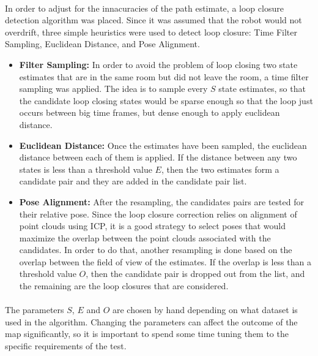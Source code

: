 \documentclass[11pt]{article}
\begin{document}
	\paragraph{}
	In order to adjust for the innacuracies of the path estimate, a loop closure detection algorithm was placed. Since it was assumed that the robot would not overdrift, three simple heuristics were used to detect loop closure: Time Filter Sampling, Euclidean Distance, and Pose Alignment. 
	\begin{itemize}
		\item \textbf{Filter Sampling:} In order to avoid the problem of loop closing two state estimates that are in the same room but did not leave the room, a time filter sampling was applied. The idea is to sample every $S$ state estimates, so that the candidate loop closing states would be sparse enough so that the loop just occurs between big time frames, but dense enough to apply euclidean distance.
		\item \textbf{Euclidean Distance:} Once the estimates have been  sampled, the euclidean distance between each of them is applied. If the distance between any two states is less than a threshold value $E$, then the two estimates form a candidate pair and they are added in the candidate pair list.
		\item \textbf{Pose Alignment:} After the resampling, the candidates pairs are tested for their relative pose. Since the loop closure correction relies on alignment of point clouds using ICP, it is a good strategy to select poses that would maximize the overlap between the point clouds associated with the candidates. In order to do that, another resampling is done based on the overlap between the field of view of the estimates. If the overlap is less than a threshold value $O$, then the candidate pair is dropped out from the list, and the remaining are the loop closures that are considered.
	\end{itemize}
	
	\paragraph{}
	The parameters $S$, $E$ and $O$ are chosen by hand depending on what dataset is used in the algorithm. Changing the parameters can affect the outcome of the map significantly, so it is important to spend some time tuning them to the specific requirements of the test.
	
\end{document}
